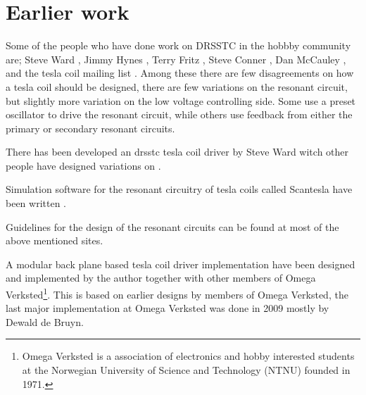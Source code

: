 \section{Earlier work}
Some of the people who have done work on DRSSTC in the hobbby community are; Steve Ward , Jimmy Hynes , Terry Fritz , Steve Conner , Dan McCauley , and the tesla coil mailing list . Among these there are few disagreements on how a tesla coil should be designed, there are few variations on the resonant circuit, but slightly more variation on the low voltage controlling side. Some use a preset oscillator to drive the resonant circuit, while others use feedback from either the primary or secondary resonant circuits.

There has been developed an drsstc tesla coil driver by Steve Ward witch other people have designed variations on .

Simulation software for the resonant circuitry of tesla coils called Scantesla have been written .

Guidelines for the design of the resonant circuits can be found at most of the above mentioned sites.

A modular back plane based tesla coil driver implementation have been designed and implemented by the author together with other members of Omega Verksted\footnote{Omega Verksted is a association of electronics and hobby interested students at the Norwegian University of Science and Technology (NTNU) founded in 1971.}. This is based on earlier designs by members of Omega Verksted, the last major implementation at Omega Verksted was done in 2009 mostly by Dewald de Bruyn.


